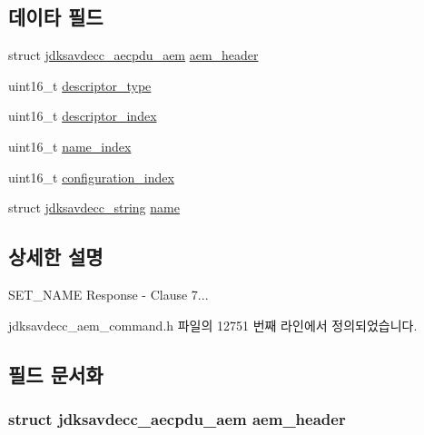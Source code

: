 \subsection*{데이타 필드}
\begin{DoxyCompactItemize}
\item 
struct \hyperlink{structjdksavdecc__aecpdu__aem}{jdksavdecc\+\_\+aecpdu\+\_\+aem} \hyperlink{structjdksavdecc__aem__command__set__name__response_ae1e77ccb75ff5021ad923221eab38294}{aem\+\_\+header}
\item 
uint16\+\_\+t \hyperlink{structjdksavdecc__aem__command__set__name__response_ab7c32b6c7131c13d4ea3b7ee2f09b78d}{descriptor\+\_\+type}
\item 
uint16\+\_\+t \hyperlink{structjdksavdecc__aem__command__set__name__response_a042bbc76d835b82d27c1932431ee38d4}{descriptor\+\_\+index}
\item 
uint16\+\_\+t \hyperlink{structjdksavdecc__aem__command__set__name__response_a898a74ada625e0b227dadb02901404e6}{name\+\_\+index}
\item 
uint16\+\_\+t \hyperlink{structjdksavdecc__aem__command__set__name__response_afaad1bd7c66f9611e134d8c5ce98f444}{configuration\+\_\+index}
\item 
struct \hyperlink{structjdksavdecc__string}{jdksavdecc\+\_\+string} \hyperlink{structjdksavdecc__aem__command__set__name__response_a7e615b51b7768e9b59bfa450051e0f8e}{name}
\end{DoxyCompactItemize}


\subsection{상세한 설명}
S\+E\+T\+\_\+\+N\+A\+ME Response -\/ Clause 7... 

jdksavdecc\+\_\+aem\+\_\+command.\+h 파일의 12751 번째 라인에서 정의되었습니다.



\subsection{필드 문서화}
\subsubsection[{\texorpdfstring{aem\+\_\+header}{aem_header}}]{\setlength{\rightskip}{0pt plus 5cm}struct {\bf jdksavdecc\+\_\+aecpdu\+\_\+aem} aem\+\_\+header}\hypertarget{structjdksavdecc__aem__command__set__name__response_ae1e77ccb75ff5021ad923221eab38294}{}\label{structjdksavdecc__aem__command__set__name__response_ae1e77ccb75ff5021ad923221eab38294}


